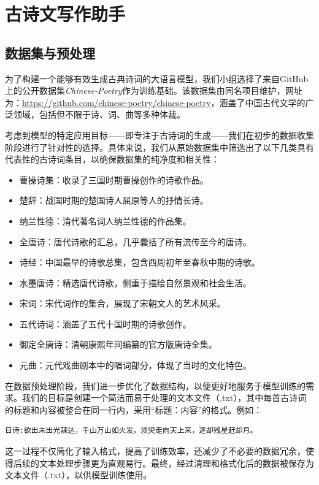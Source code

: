 \section{古诗文写作助手}\label{sec-7}
\subsection{数据集与预处理}
为了构建一个能够有效生成古典诗词的大语言模型，我们小组选择了来自GitHub上的公开数据集\textit{Chinese-Poetry}作为训练基础。该数据集由同名项目维护，网址为：\url{https://github.com/chinese-poetry/chinese-poetry}，涵盖了中国古代文学的广泛领域，包括但不限于诗、词、曲等多种体裁。
    
考虑到模型的特定应用目标——即专注于古诗词的生成——我们在初步的数据收集阶段进行了针对性的选择。具体来说，我们从原始数据集中筛选出了以下几类具有代表性的古诗词条目，以确保数据集的纯净度和相关性：
\begin{itemize}
    \item 曹操诗集：收录了三国时期曹操创作的诗歌作品。
    \item 楚辞：战国时期的楚国诗人屈原等人的抒情长诗。
    \item 纳兰性德：清代著名词人纳兰性德的作品集。
    \item 全唐诗：唐代诗歌的汇总，几乎囊括了所有流传至今的唐诗。
    \item 诗经：中国最早的诗歌总集，包含西周初年至春秋中期的诗歌。
    \item 水墨唐诗：精选唐代诗歌，侧重于描绘自然景观和社会生活。
    \item 宋词：宋代词作的集合，展现了宋朝文人的艺术风采。
    \item 五代诗词：涵盖了五代十国时期的诗歌创作。
    \item 御定全唐诗：清朝康熙年间编纂的官方版唐诗全集。
    \item 元曲：元代戏曲剧本中的唱词部分，体现了当时的文化特色。
\end{itemize}
    
在数据预处理阶段，我们进一步优化了数据结构，以便更好地服务于模型训练的需求。我们的目标是创建一个简洁而易于处理的文本文件（.txt），其中每首古诗词的标题和内容被整合在同一行内，采用“标题：内容”的格式。例如：
\begin{verbatim}
日诗:欲出未出光辣达，千山万山如火发。须臾走向天上来，逐却残星赶却月。
\end{verbatim}

这一过程不仅简化了输入格式，提高了训练效率，还减少了不必要的数据冗余，使得后续的文本处理步骤更为直观易行。最终，经过清理和格式化后的数据被保存为文本文件（.txt），以供模型训练使用。
